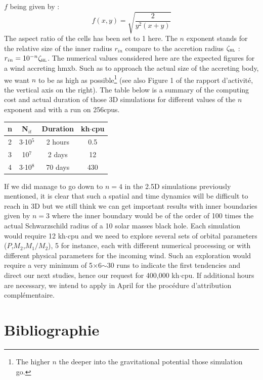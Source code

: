 \documentclass[
    a4paper, 
    12pt, onecolumn,
]{article}
\begin{document}
$f$ being given by :
\begin{equation}
f(x,y)=\sqrt{\frac{2}{y^2(x+y)}}
\end{equation}
The aspect ratio of the cells has been set to 1 here. The $n$ exponent stands for the relative size of the inner radius $r_{in}$ compare to the accretion radius $\zeta _{\textsc{hl}}$ : $r_{in}=10^{-n}\zeta _{\textsc{hl}}$. The numerical values considered here are the expected figures for a wind accreting {\sc hmxb}. Such as to approach the actual size of the accreting body, we want $n$ to be as high as possible\footnote{The higher $n$ the deeper into the gravitational potential those simulation go.} (see also Figure 1 of the rapport d'activit\'e, the vertical axis on the right). The table below is a summary of the computing cost and actual duration of those 3D simulations for different values of the $n$ exponent and with a run on 256{\sc cpu}s.
\begin{table}[h]
\centering
\begin{tabular}{|c|c|c|c|}
\hline
n & N$_{it}$ & Duration & kh$\cdot${\sc cpu} \\\hline
2 & 3$\cdot$10$^5$ & 2 hours & 0.5\\ \hline 
3 & 10$^7$ & 2 days & 12 \\ \hline
4 & 3$\cdot$10$^8$ & 70 days & 430 \\ \hline
\end{tabular}
\end{table}
If we did manage to go down to $n=4$ in the 2.5D simulations previously mentioned, it is clear that such a spatial and time dynamics will be difficult to reach in 3D but we still think we can get important results with inner boundaries given by $n=3$ where the inner boundary would be of the order of 100 times the actual Schwarzschild radius of a 10 solar masses black hole. Each simulation would require 12 kh$\cdot${\sc cpu} and we need to explore several sets of orbital parameters ($P$,$M_2$,$M_1/M_2$), 5 for instance, each with different numerical processing or with different physical parameters for the incoming wind. Such an exploration would require a very minimum of 5$\times$6$\sim$30 runs to indicate the first tendencies and direct our next studies, hence our request for 400,000 kh$\cdot${\sc cpu}. If additional hours are necessary, we intend to apply in April for the proc\'edure d'attribution compl\'ementaire.   
\cite{ElMellah2015}\cite{ElMellah2015a}\cite{Rappaport2013}\cite{Rappaport:2012wi}\cite{SanchisOjeda:2014ww}\cite{ElMellah2015b}

\newpage\section{Bibliographie}
\label{Sec:Biblio}
 


\end{document}
